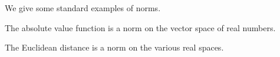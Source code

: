 

We give some standard examples
of norms.


\begin{expl}
  The absolute value
  function is a norm
  on the vector space
  of real numbers.
\end{expl}

\begin{expl}
  The Euclidean distance
  is a norm on the various
  real spaces.
\end{expl}

\blankpage
